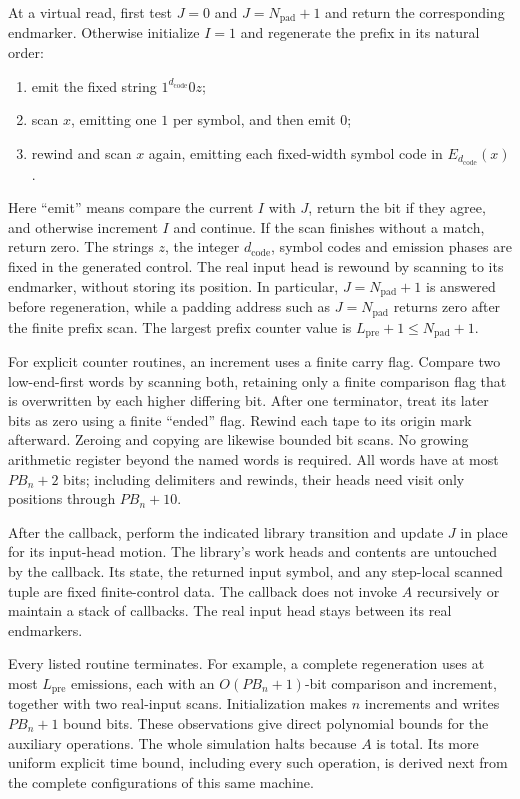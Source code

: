 At a virtual read, first test $J=0$ and $J=N_{\mathrm{pad}}+1$ and return
the corresponding endmarker.  Otherwise initialize $I=1$ and regenerate
the prefix in its natural order:
\begin{enumerate}
 \item emit the fixed string $1^{d_{\mathrm{code}}}0z$;
 \item scan $x$, emitting one $1$ per symbol, and then emit $0$;
 \item rewind and scan $x$ again, emitting each fixed-width symbol code
       in $E_{d_{\mathrm{code}}}(x)$.
\end{enumerate}
Here ``emit'' means compare the current $I$ with $J$, return the bit
if they agree, and otherwise increment $I$ and continue.  If the scan
finishes without a match, return zero.  The strings $z$, the integer
$d_{\mathrm{code}}$, symbol codes and emission phases are fixed in
the generated control.  The real input head is rewound by scanning to
its endmarker, without storing its position.  In particular,
$J=N_{\mathrm{pad}}+1$ is answered before regeneration, while a padding
address such as $J=N_{\mathrm{pad}}$ returns zero after the finite
prefix scan.  The largest prefix counter value is
$L_{\mathrm{pre}}+1\le N_{\mathrm{pad}}+1$.

For explicit counter routines, an increment uses a finite carry flag.
Compare two low-end-first words by scanning both, retaining only a
finite comparison flag that is overwritten by each higher differing
bit.  After one terminator, treat its later bits as zero using a finite
``ended'' flag.  Rewind each tape to its origin mark afterward.  Zeroing
and copying are likewise bounded bit scans.  No growing arithmetic
register beyond the named words is required.  All words have at most
$PB_n+2$ bits; including delimiters and rewinds, their heads need visit
only positions through $PB_n+10$.

After the callback, perform the indicated library transition and update
$J$ in place for its input-head motion.  The library's work heads and
contents are untouched by the callback.  Its state, the returned input
symbol, and any step-local scanned tuple are fixed finite-control data.
The callback does not invoke $A$ recursively or maintain a stack of
callbacks.  The real input head stays between its real endmarkers.

Every listed routine terminates.  For example, a complete regeneration
uses at most $L_{\mathrm{pre}}$ emissions, each with an
$O(PB_n+1)$-bit comparison and increment, together with two real-input
scans.  Initialization makes $n$ increments and writes $PB_n+1$ bound
bits.  These observations give direct polynomial bounds for the
auxiliary operations.  The whole simulation halts because $A$ is total.
Its more uniform explicit time bound, including every such operation,
is derived next from the complete configurations of this same machine.


